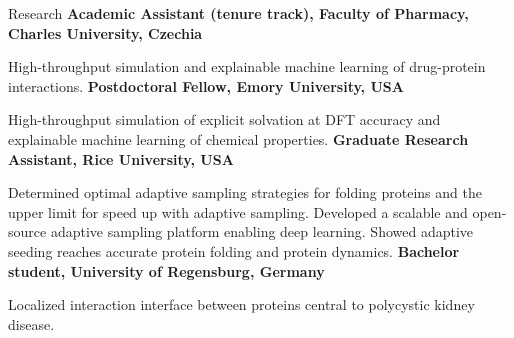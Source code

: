 \begin{rubric}{Research}
%
  \textbf{Academic Assistant (tenure track), Faculty of Pharmacy, Charles University, Czechia}
  \par High-throughput simulation and explainable machine learning of drug-protein interactions.
\entry*[2020 -- 2022]%
	\textbf{Postdoctoral Fellow, Emory University, USA}
  \par High-throughput simulation of explicit solvation at DFT accuracy and explainable machine learning of chemical properties. 
\entry*[2014 -- 2020]%
  \textbf{Graduate Research Assistant, Rice University, USA}
  \par Determined optimal adaptive sampling strategies for folding proteins and the upper limit for speed up with adaptive sampling. Developed a scalable and open-source adaptive sampling platform enabling deep learning. Showed adaptive seeding reaches accurate protein folding and protein dynamics.
\entry*[2012]%
  \textbf{Bachelor student, University of Regensburg, Germany}
  \par Localized interaction interface between proteins central to polycystic kidney disease.
\end{rubric}
